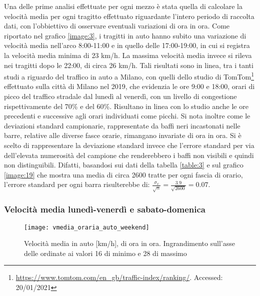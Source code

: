 Una delle prime analisi effettuate per ogni mezzo è stata quella di calcolare la velocità media per ogni tragitto effettuato riguardante l'intero periodo di raccolta dati, con l'obbiettivo di osservare eventuali variazioni di ora in ora. Come riportato nel grafico \ref{image:3}, i tragitti in auto hanno subito una variazione di velocità media nell'arco 8:00-11:00 e in quello delle 17:00-19:00, in cui si registra la velocità media minima di 23 km/h. La massima velocità media invece si rileva nei tragitti dopo le 22:00, di circa 26 km/h. Tali risultati sono in linea, tra i tanti studi a riguardo del traffico in auto a Milano, con quelli dello studio di TomTom\footnote{\url{https://www.tomtom.com/en_gb/traffic-index/ranking/}. Accessed: 20/01/2021} effettuato sulla città di Milano nel 2019, che evidenzia le ore 9:00 e 18:00, orari di picco del traffico stradale dal lunedì al venerdì, con un livello di congestione rispettivamente del 70\% e del 60\%. Risultano in linea con lo studio anche le ore precedenti e successive agli orari individuati come picchi. Si nota inoltre come le deviazioni standard campionarie, rappresentate da baffi neri incastonati nelle barre, relative alle diverse fasce orarie, rimangano invariate di ora in ora. Si è scelto di rappresentare la deviazione standard invece che l'errore standard per via dell'elevata numerosità del campione che renderebbero i baffi non visibili e quindi non distinguibili. Difatti, basandosi sui dati della tabella \ref{table:3} e sul grafico \ref{image:19} che mostra una media di circa 2600 tratte per ogni fascia di orario, l'errore standard per ogni barra risulterebbe di: $\frac{\sigma_x}{\sqrt{n}} = \frac{3.9}{\sqrt{2600}} = 0.07$.

\subsubsection{Velocità media lunedì-venerdì e sabato-domenica}

\begin{figure}[H]
\texttt{[image: vmedia\_oraria\_auto\_weekend]}
\caption{Velocità media in auto [km/h], di ora in ora. Ingrandimento sull'asse delle ordinate ai valori 16 di minimo e 28 di massimo}
\label{image:4}
\end{figure}

